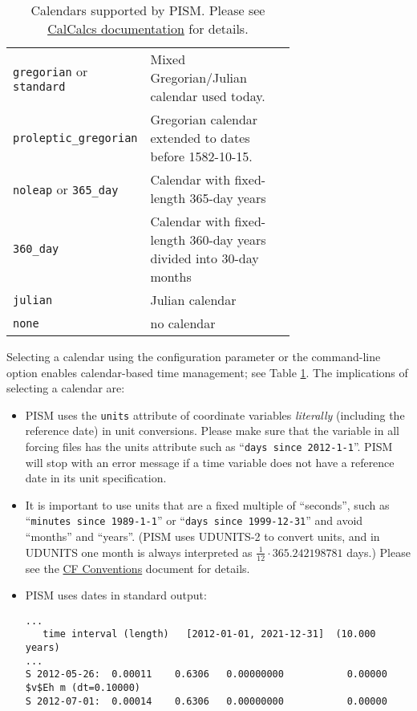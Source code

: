 \begin{table}
  \centering
  \begin{tabular}{lp{0.7\linewidth}}
    \texttt{gregorian} or \texttt{standard} & Mixed Gregorian/Julian calendar used today.\\
    \texttt{proleptic_gregorian} & Gregorian calendar extended to dates before 1582-10-15.\\
    \texttt{noleap} or \texttt{365_day} & Calendar with fixed-length 365-day years\\
    \texttt{360_day} & Calendar with fixed-length 360-day years divided into 30-day months\\
    \texttt{julian} & Julian calendar \\
    \texttt{none} & no calendar\\
  \end{tabular}
  \caption{Calendars supported by PISM. Please see \href{http://meteora.ucsd.edu/~pierce/calcalcs/calendars.html}{CalCalcs documentation} for details.}
  \label{tab:calendars}
\end{table}

Selecting a calendar using the  configuration parameter or the  command-line option enables calendar-based time management; see Table \ref{tab:calendars}.  The implications of selecting a calendar are:
\begin{itemize}
\item PISM uses the \texttt{units} attribute of coordinate variables
  \emph{literally} (including the reference date) in unit conversions. Please
  make sure that the  variable in all forcing files has the
  units attribute such as ``\texttt{days since 2012-1-1}''. PISM will stop with
  an error message if a time variable does not have a reference date in its
  unit specification.
\item It is important to use units that are a fixed multiple of ``seconds'',
  such as ``\texttt{minutes since 1989-1-1}'' or ``\texttt{days since
    1999-12-31}'' and avoid ``months'' and ``years''. (PISM uses UDUNITS-2 to
  convert units, and in UDUNITS one month is always interpreted as
  $\frac{1}{12}\cdot 365.242198781$ days.) Please see the 
  \href{http://cf-pcmdi.llnl.gov/documents/cf-conventions/1.6/cf-conventions.html#time-coordinate}{CF
    Conventions} document for details.
\item PISM uses dates in standard output:
\begin{verbatim}
...
   time interval (length)   [2012-01-01, 2021-12-31]  (10.000 years)
...
S 2012-05-26:  0.00011    0.6306   0.00000000           0.00000
$v$Eh m (dt=0.10000)
S 2012-07-01:  0.00014    0.6306   0.00000000           0.00000
\end{verbatim}
\end{itemize}

